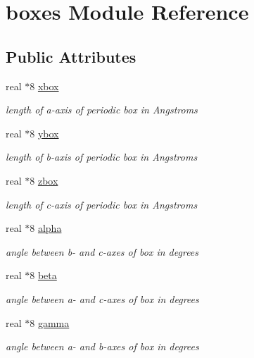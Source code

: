\hypertarget{classboxes}{\section{boxes Module Reference}
\label{classboxes}
}
\subsection*{Public Attributes}
\begin{DoxyCompactItemize}
\item 
real $\ast$8 \hyperlink{classboxes_ae4dfe3914f47ce2bafd49eedbb1c740a}{xbox}
\begin{DoxyCompactList}\small\item\em length of a-\/axis of periodic box in Angstroms \end{DoxyCompactList}\item 
real $\ast$8 \hyperlink{classboxes_afe5321269ac54818115405d3424f39ab}{ybox}
\begin{DoxyCompactList}\small\item\em length of b-\/axis of periodic box in Angstroms \end{DoxyCompactList}\item 
real $\ast$8 \hyperlink{classboxes_aa2b953bb3bba616ffc87f57e29cfdf6c}{zbox}
\begin{DoxyCompactList}\small\item\em length of c-\/axis of periodic box in Angstroms \end{DoxyCompactList}\item 
real $\ast$8 \hyperlink{classboxes_a6c476981aef5058cb9f12ce309ca043b}{alpha}
\begin{DoxyCompactList}\small\item\em angle between b-\/ and c-\/axes of box in degrees \end{DoxyCompactList}\item 
real $\ast$8 \hyperlink{classboxes_af8ca3edf3656e0bb9681c3e0a38bc1df}{beta}
\begin{DoxyCompactList}\small\item\em angle between a-\/ and c-\/axes of box in degrees \end{DoxyCompactList}\item 
real $\ast$8 \hyperlink{classboxes_a2b56941f0a6ab84834791d9db89af298}{gamma}
\begin{DoxyCompactList}\small\item\em angle between a-\/ and b-\/axes of box in degrees \end{DoxyCompactList}\item 

\end{DoxyCompactItemize}
